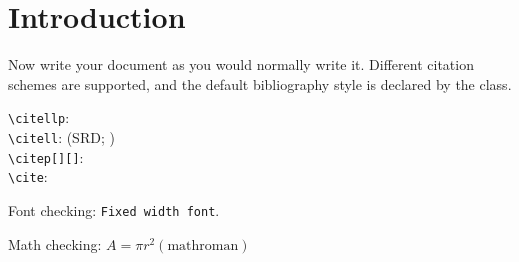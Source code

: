 \section{Introduction}

Now write your document as you would normally write it.
Different citation schemes are supported, and the default bibliography style is declared by the class.

\verb|\citellp|:  \\
\verb|\citell|: (SRD; ) \\
\verb|\citep[][]|: \citep[e.g.,][are interesting]{LPM-17,LSE-29} \\
\verb|\cite|: \cite{LPM-17,LSE-29}

Font checking: \texttt{Fixed width font}.

Math checking: $A = \pi r^2 \mathrm{(math roman)}$


